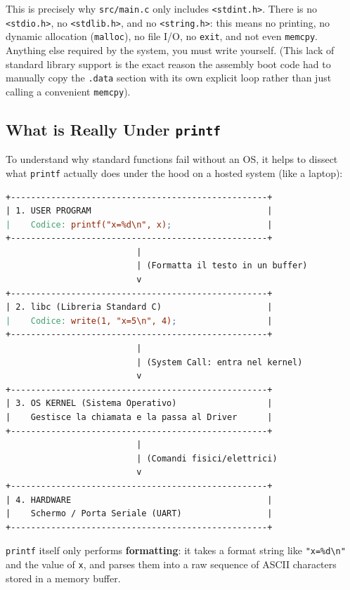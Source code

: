 This is precisely why \texttt{src/main.c} only includes \texttt{<stdint.h>}. There is no \texttt{<stdio.h>}, no \texttt{<stdlib.h>}, and no \texttt{<string.h>}: this means no printing, no dynamic allocation (\texttt{malloc}), no file I/O, no \texttt{exit}, and not even \texttt{memcpy}. Anything else required by the system, you must write yourself. (This lack of standard library support is the exact reason the assembly boot code had to manually copy the \texttt{.data} section with its own explicit loop rather than just calling a convenient \texttt{memcpy}).

\subsection{What is Really Under \texttt{printf}}
To understand why standard functions fail without an OS, it helps to dissect what \texttt{printf} actually does under the hood on a hosted system (like a laptop):

\begin{lstlisting}[language=make]
+---------------------------------------------------+
| 1. USER PROGRAM                                   |
|    Codice: printf("x=%d\n", x);                   |
+---------------------------------------------------+
                          |
                          | (Formatta il testo in un buffer)
                          v
+---------------------------------------------------+
| 2. libc (Libreria Standard C)                     |
|    Codice: write(1, "x=5\n", 4);                  |
+---------------------------------------------------+
                          |
                          | (System Call: entra nel kernel)
                          v
+---------------------------------------------------+
| 3. OS KERNEL (Sistema Operativo)                  |
|    Gestisce la chiamata e la passa al Driver      |
+---------------------------------------------------+
                          |
                          | (Comandi fisici/elettrici)
                          v
+---------------------------------------------------+
| 4. HARDWARE                                       |
|    Schermo / Porta Seriale (UART)                 |
+---------------------------------------------------+
\end{lstlisting}

\texttt{printf} itself only performs \textbf{formatting}: it takes a format string like \texttt{"x=\%d\textbackslash{}n"} and the value of \texttt{x}, and parses them into a raw sequence of ASCII characters stored in a memory buffer. 

